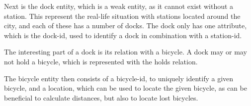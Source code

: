 Next is the dock entity, which is a weak entity, as it cannot exist without a station.
This represent the real-life situation with stations located around the city, and each of these has a number of docks.
The dock only has one attribute, which is the dock-id, used to identify a dock in combination with a station-id.

The interesting part of a dock is its relation with a bicycle.
A dock may or may not hold a bicycle, which is represented with the holds relation.

The bicycle entity then consists of a bicycle-id, to uniquely identify a given bicycle, and a location, which can be used to locate the given bicycle, as can be beneficial to calculate distances, but also to locate lost bicycles.